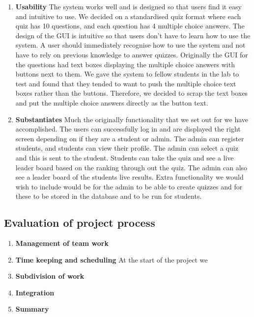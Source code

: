 \begin{enumerate}
	\item \textbf{Usability}
		The system works well and is designed so that users find it easy and intuitive to use.
		We decided on a standardised quiz format where each quiz has 10 questions, and each question
		has 4 multiple choice answers. The design of the GUI is intuitive so that users don't
		have to learn how to use the system. A user should immediately recognise how to use the
		system and not have to rely on previous knowledge to answer quizzes. Originally the GUI for 
		the questions had text boxes displaying the multiple choice answers with buttons next to
		them. We gave the system to fellow students in the lab to test and found that they tended
		to want to push the multiple choice text boxes rather than the buttons. Therefore, we decided
		to scrap the text boxes and put the multiple choice answers directly as the button text.
	
	\item \textbf{Substantiates}
		Much the originally functionality that we set out for we have accomplished.
		The users can successfully log in and are displayed the right screen depending
		on if they are a student or admin. The admin can register students, and
		students can view their profile. The admin can select a quiz and this is
		sent to the student. Students can take the quiz and see a live leader board
		based on the ranking through out the quiz. The admin can also see a leader
		board of the students live results. Extra functionality we would wish to include
		would be for the admin to be able to create quizzes and for these to be stored in
		the database and to be run for students.

\end{enumerate}

\subsection{Evaluation of project process}
\label{sub:evaluation_of_project_process}

\begin{enumerate}

	\item \textbf{Management of team work}

	\item \textbf{Time keeping and scheduling}
		At the start of the project we 
	
	\item \textbf{Subdivision of work}

	\item \textbf{Integration}

	\item \textbf{Summary}

\end{enumerate}
